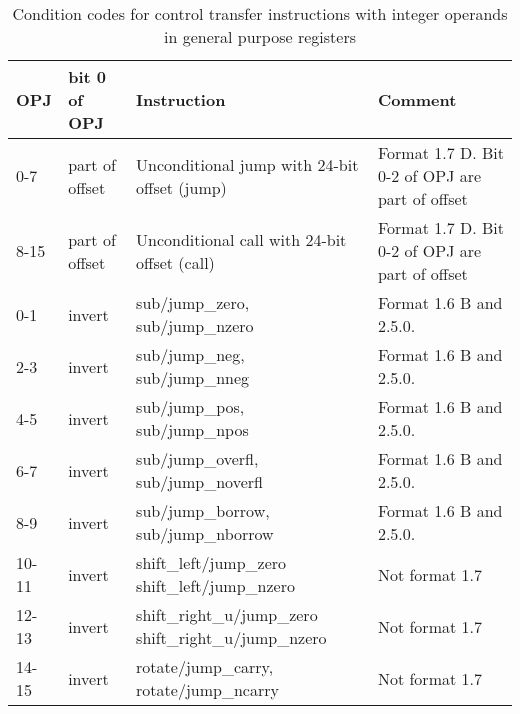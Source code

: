 \documentclass[forwardcom.tex]{subfiles}
\begin{document}
\begin{longtable}
{|p{12mm}|p{16mm}|p{60mm}|p{55mm}|}
\caption{Condition codes for control transfer instructions with integer operands in general purpose registers }
\label{table:controlTransferInstructions}
\endfirsthead
\endhead
\hline
\bfseries OPJ & \bfseries bit 0 \newline of OPJ & \bfseries Instruction & \bfseries Comment \\
\hline
0-7 & part of offset & Unconditional jump with 24-bit offset (jump) & Format 1.7 D. Bit 0-2 of OPJ are part of offset \\
\hline
8-15 & part of offset & Unconditional call with 24-bit offset (call) & Format 1.7 D.  Bit 0-2 of OPJ are part of offset \\
\hline
0-1 & invert & sub/jump\_zero, \newline sub/jump\_nzero & Format 1.6 B and 2.5.0. \\
\hline
2-3 & invert & sub/jump\_neg, \newline sub/jump\_nneg & Format 1.6 B and 2.5.0.  \\
\hline
4-5 & invert & sub/jump\_pos, \newline sub/jump\_npos & Format 1.6 B and 2.5.0.  \\
\hline
6-7 & invert & sub/jump\_overfl, \newline sub/jump\_noverfl & Format 1.6 B and 2.5.0.  \\
\hline
8-9 & invert & sub/jump\_borrow, \newline sub/jump\_nborrow & Format 1.6 B and 2.5.0. \\
\hline
10-11 & invert & shift\_left/jump\_zero \newline shift\_left/jump\_nzero & Not format 1.7 \\
\hline
12-13 & invert & shift\_right\_u/jump\_zero \newline shift\_right\_u/jump\_nzero & Not format 1.7 \\
\hline
14-15 & invert & rotate/jump\_carry, \newline rotate/jump\_ncarry & Not format 1.7 \\
\hline


\end{longtable}
\end{document}
